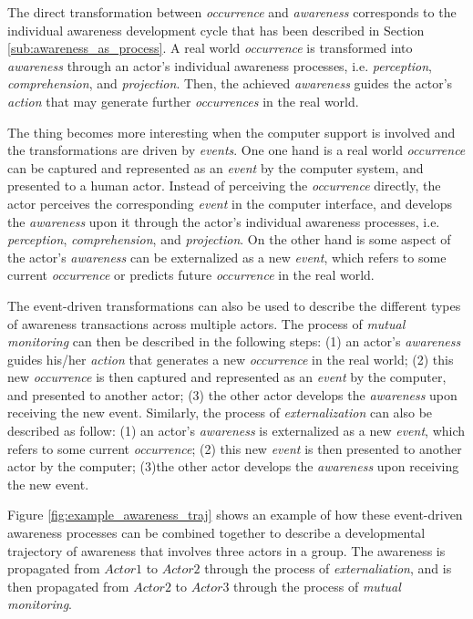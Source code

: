 The direct transformation between \emph{occurrence} and \emph{awareness} corresponds to the individual awareness development cycle that has been described in Section \ref{sub:awareness_as_process}. A real world \emph{occurrence} is transformed into \emph{awareness} through an actor's individual awareness processes, i.e. \emph{perception}, \emph{comprehension}, and \emph{projection}. Then, the achieved \emph{awareness} guides the actor's \emph{action} that may generate further \emph{occurrences} in the real world. 

The thing becomes more interesting when the computer support is involved and the transformations are driven by \emph{events}. One one hand is a real world \emph{occurrence} can be captured and represented as an \emph{event} by the computer system, and presented to a human actor. Instead of perceiving the \emph{occurrence} directly, the actor perceives the corresponding \emph{event} in the computer interface, and develops the \emph{awareness} upon it through the actor's individual awareness processes, i.e. \emph{perception}, \emph{comprehension}, and \emph{projection}. On the other hand is some aspect of the actor's \emph{awareness} can be externalized as a new \emph{event}, which refers to some current \emph{occurrence} or predicts future \emph{occurrence} in the real world.

The event-driven transformations can also be used to describe the different types of awareness transactions across multiple actors. The process of \emph{mutual monitoring} can then be described in the following steps: (1) an actor's \emph{awareness} guides his/her \emph{action} that generates a new \emph{occurrence} in the real world; (2) this new \emph{occurrence} is then captured and represented as an \emph{event} by the computer, and presented to another actor; (3) the other actor develops the \emph{awareness} upon receiving the new event. Similarly, the process of \emph{externalization} can also be described as follow: (1) an actor's \emph{awareness} is externalized as a new \emph{event}, which refers to some current \emph{occurrence}; (2) this new \emph{event} is then presented to another actor by the computer; (3)the other actor develops the \emph{awareness} upon receiving the new event. 

Figure \ref{fig:example_awareness_traj} shows an example of how these event-driven awareness processes can be combined together to describe a developmental trajectory of awareness that involves three actors in a group. The awareness is propagated from $Actor1$ to $Actor2$ through the process of \emph{externaliation}, and is then propagated from $Actor2$ to $Actor3$ through the process of \emph{mutual monitoring}.

